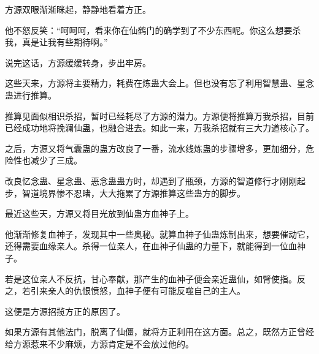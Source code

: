 \begin{this_body}
方源双眼渐渐眯起，静静地看着方正。

他不怒反笑：“呵呵呵，看来你在仙鹤门的确学到了不少东西呢。你这么想要杀我，真是让我有些期待啊。”

说完这话，方源缓缓转身，步出牢房。

这些天来，方源将主要精力，耗费在炼蛊大会上。但也没有忘了利用智慧蛊、星念蛊进行推算。

推算见面似相识杀招，暂时已经耗尽了方源的潜力。方源便将推算万我杀招，目前已经成功地将挽澜仙蛊，也融合进去。如此一来，万我杀招就有三大力道核心了。

之后，方源又将气囊蛊的蛊方改良了一番，流水线炼蛊的步骤增多，更加细分，危险性也减少了三成。

改良忆念蛊、星念蛊、恶念蛊蛊方时，却遇到了瓶颈，方源的智道修行才刚刚起步，智道境界惨不忍睹，大大拖累了方源推算这些蛊方的脚步。

最近这些天，方源又将目光放到仙蛊方血神子上。

他渐渐修复血神子，发现其中一些奥秘。就算血神子仙蛊炼制出来，想要催动它，还得需要血缘亲人。杀得一位亲人，在血神子仙蛊的力量下，就能得到一位血神子。

若是这位亲人不反抗，甘心奉献，那产生的血神子便会亲近蛊仙，如臂使指。反之，若引来亲人的仇恨愤怒，血神子便有可能反噬自己的主人。

这便是方源招揽方正的原因了。

如果方源有其他法门，脱离了仙僵，就将方正利用在这方面。总之，既然方正曾经给方源惹来不少麻烦，方源肯定是不会放过他的。

\end{this_body}

